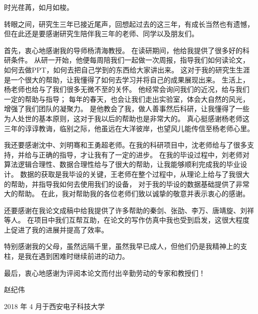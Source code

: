 
\begin{thanks}

时光荏苒，如月如梭。\par

转眼之间，研究生三年已接近尾声，回想起过去的这三年，有成长当然也有遗憾，
但在此还是要感谢研究生陪伴我三年的老师、同学以及朋友们。\par

首先，衷心地感谢我的导师杨清海教授。
在读研期间，他给我提供了很多好的科研条件。
从研一开始，他便每周陪我们一起做一次周报，指导我们如何读论文，如何去做PPT，如何去把自己学到的东西给大家讲出来。
这对于我的研究生生涯是一个很大的帮助，让我懂得了如何去学习并将自己的成果展现出来。
生活上，杨老师也给与了我们很多无微不至的关怀。
他经常会询问我们的近况，给与我们一定的帮助与指导；
每年的春天，也会让我们走出实验室，体会大自然的风光，增强了我们团队的凝聚力。
是他教会了我，做人善事然后科研，让我懂得了一些为人处世的基本原则，这对于我以后的帮助也是非常大的。
真心挺感谢杨老师这三年的谆谆教诲，临别之际，他虽远在大洋彼岸，也望风儿能传信至杨老师心里。\par

我还要感谢沈中、刘明骞和王勇超老师。在我的科研项目中，沈老师给与了很多支持，并给与正确的指导，才让我有了一定的进步。
在我的毕设过程中，刘老师对算法逻辑合理性、数据合理性给与了很大的帮助，让我能够顺利完成我的毕业设计。
数据的获取是我毕设的关键，王老师在整个过程中，从理论上给与了我很大的帮助，并指导我如何去使用我们的设备，
对于我的毕设的数据基础提供了非常大的帮助。
在此，我对帮助我的各位老师们致以诚挚的敬意并表示衷心的感谢。

还要感谢在我论文成稿中给我提供了许多帮助的秦剑、张劭、李万、唐靖旋、刘祥等人。
在项目中我们互帮互助，在论文的写作仿真中我也受到启发，这很大程度上促进了我的进展并提高了效率。 \par

特别感谢我的父母，虽然远隔千里，虽然我早已成人，但他们仍是我精神上的支柱，是我在遇到困难时继续前进的动力。\par

最后，衷心地感谢为评阅本论文而付出辛勤劳动的专家和教授们！ \par

赵纪伟\par

2018 年 4 月于西安电子科技大学\par

\end{thanks}
